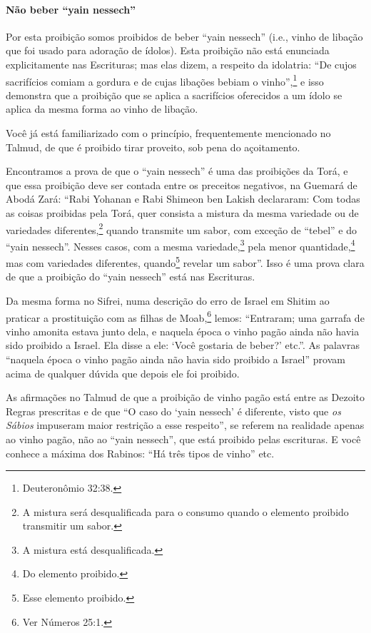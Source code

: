 \paragraph{Não beber ``yain nessech''}

Por esta proibição somos proibidos de beber ``yain nessech'' (i.e.,
vinho de libação que foi usado para adoração de ídolos). Esta proibição
não está enunciada explicitamente nas Escrituras; mas elas dizem, a
respeito da idolatria: ``De cujos sacrifícios comiam a gordura e de
cujas libações bebiam o vinho'',\footnote{Deuteronômio 32:38.} e isso demonstra
que a proibição que se aplica a sacrifícios oferecidos a um ídolo se
aplica da mesma forma ao vinho de libação.

Você já está familiarizado com o princípio, frequentemente mencionado
no Talmud, de que é proibido tirar proveito, sob pena do açoitamento.

Encontramos a prova de que o ``yain nessech'' é uma das proibições da
Torá, e que essa proibição deve ser contada entre os preceitos
negativos, na Guemará de Abodá Zará: ``Rabi Yohanan e Rabi Shimeon ben
Lakish declararam: Com todas as coisas proibidas pela Torá, quer
consista a mistura da mesma variedade ou de variedades
diferentes,\footnote{A mistura será desqualificada para o consumo quando o elemento
  proibido transmitir um sabor.} quando transmite um sabor, com exceção
de ``tebel'' e do ``yain nessech''. Nesses casos, com a mesma
variedade,\footnote{A mistura está desqualificada.} pela menor
quantidade,\footnote{Do elemento proibido.} mas com variedades diferentes,
quando\footnote{Esse elemento proibido.} revelar um sabor''. Isso é uma prova clara
de que a proibição do ``yain nessech'' está nas Escrituras.

Da mesma forma no Sifrei, numa descrição do erro de Israel em Shitim ao
praticar a prostituição com as filhas de Moab,\footnote{Ver Números 25:1.}
lemos: ``Entraram; uma garrafa de vinho amonita estava junto dela, e naquela época o vinho pagão ainda não havia sido proibido a Israel. Ela disse a ele: `Você
gostaria de beber?' etc.''. As palavras ``naquela época o vinho pagão
ainda não havia sido proibido a Israel'' provam acima de qualquer dúvida
que depois ele foi proibido.

As afirmações no Talmud de que a proibição de vinho pagão está entre as
Dezoito Regras prescritas e de que ``O caso do `yain nessech' é
diferente, visto que \emph{os Sábios} impuseram maior restrição a esse
respeito'', se referem na realidade apenas ao vinho pagão, não ao
``yain nessech'', que está proibido pelas escrituras.
E você conhece a máxima dos Rabinos: ``Há três tipos de vinho'' etc.

